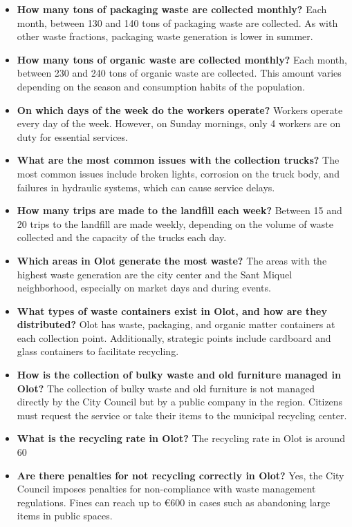 \begin{itemize}
\item \textbf{How many tons of packaging waste are collected monthly?}
Each month, between 130 and 140 tons of packaging waste are collected. As with other waste fractions, packaging waste generation is lower in summer.
\item \textbf{How many tons of organic waste are collected monthly?}
Each month, between 230 and 240 tons of organic waste are collected. This amount varies depending on the season and consumption habits of the population.
\item \textbf{On which days of the week do the workers operate?}
Workers operate every day of the week. However, on Sunday mornings, only 4 workers are on duty for essential services.
\item \textbf{What are the most common issues with the collection trucks?}
The most common issues include broken lights, corrosion on the truck body, and failures in hydraulic systems, which can cause service delays.
\item \textbf{How many trips are made to the landfill each week?}
Between 15 and 20 trips to the landfill are made weekly, depending on the volume of waste collected and the capacity of the trucks each day.
\item \textbf{Which areas in Olot generate the most waste?}
The areas with the highest waste generation are the city center and the Sant Miquel neighborhood, especially on market days and during events.
\item \textbf{What types of waste containers exist in Olot, and how are they distributed?}
Olot has waste, packaging, and organic matter containers at each collection point. Additionally, strategic points include cardboard and glass containers to facilitate recycling.
\item \textbf{How is the collection of bulky waste and old furniture managed in Olot?}
The collection of bulky waste and old furniture is not managed directly by the City Council but by a public company in the region. Citizens must request the service or take their items to the municipal recycling center.
\item \textbf{What is the recycling rate in Olot?}
The recycling rate in Olot is around 60%
\item \textbf{Are there penalties for not recycling correctly in Olot?}
Yes, the City Council imposes penalties for non-compliance with waste management regulations. Fines can reach up to €600 in cases such as abandoning large items in public spaces.

\end{itemize}
